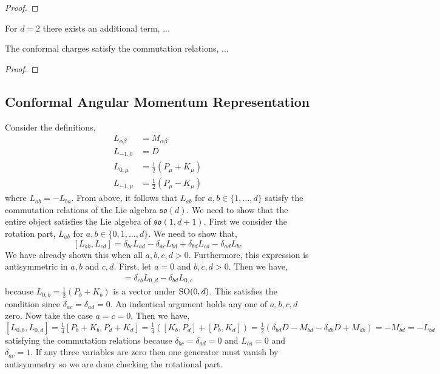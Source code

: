 \documentclass[12pt]{extarticle}
\begin{document}
\begin{proof}

\end{proof}

\begin{proposition}
For $d = 2$ there exists an additional term, ...
\end{proposition}

\begin{theorem}
The conformal charges satisfy the commutation relations,
...
\end{theorem}

\begin{proof}

\end{proof}


\subsection{Conformal Angular Momentum Representation}

Consider the definitions,
\begin{align*}
L_{\alpha \beta} & = M_{\alpha \beta}
\\
L_{-1,0} & = D
\\
L_{0, \mu} & = \tfrac{1}{2} (P_\mu + K_\mu)
\\
L_{-1, \mu} & = \tfrac{1}{2} (P_{\mu} - K_{\mu})
\end{align*} 
where $L_{ab} = - L_{ba}$. From above, it follows that $L_{ab}$ for $a,b \in \{1, \dots, d\}$ satisfy the commutation relations of the Lie algebra $\mathfrak{so}(d)$. We need to show that the entire object satisfies the Lie algebra of $\mathfrak{so}(1, d+1)$. First we consider the rotation part, $L_{ab}$ for $a,b \in \{0, 1, \dots, d\}$. We need to show that,
\[ [ L_{ab}, L_{cd} ] = \delta_{bc} L_{ad} - \delta_{ac} L_{bd} + \delta_{bd} L_{ca} - \delta_{ad} L_{bc} \]
We have already shown this when all $a,b,c,d > 0$. Furthermore, this expression is antisymmetric in $a,b$ and $c,d$. First, let $a = 0$ and $b, c, d > 0$. Then we have,
\begin{align*}
[L_{0,b}, L_{cd}] = \delta_{cb} L_{0, d} -\delta_{bd} L_{0,c}
\end{align*}
because $L_{0,b} = \tfrac{1}{2} (P_{b} + K_{b})$ is a vector under $\mathrm{SO}(0, d)$. This satisfies the condition since $\delta_{ac} = \delta_{ad} = 0$. An indentical argument holds any one of $a,b,c,d$ zero. Now take the case $a = c = 0$. Then we have,
\[ [L_{0,b}, L_{0,d}] = \tfrac{1}{4} [P_b + K_b, P_d + K_d] = \tfrac{1}{4} \left( [K_b, P_d] + [P_b, K_d] \right) = \tfrac{1}{2} (\delta_{bd} D - M_{bd} - \delta_{db} D + M_{db}) = - M_{bd} = - L_{bd}  \] 
satisfying the commutation relations because $\delta_{bc} =\delta_{ad} = 0$ and $L_{ca} = 0$ and $\delta_{ac} = 1$. If any three variables are zero then one generator must vanish by antisymmetry so we are done checking the rotational part. 
\end{document}
